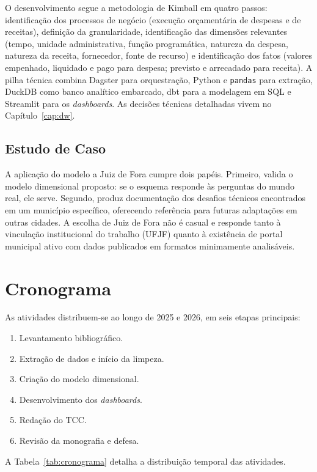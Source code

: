 O desenvolvimento segue a metodologia de Kimball em quatro passos: identificação dos processos de negócio (execução orçamentária de despesas e de receitas), definição da granularidade, identificação das dimensões relevantes (tempo, unidade administrativa, função programática, natureza da despesa, natureza da receita, fornecedor, fonte de recurso) e identificação dos fatos (valores empenhado, liquidado e pago para despesa; previsto e arrecadado para receita). A pilha técnica combina Dagster para orquestração, Python e \texttt{pandas} para extração, DuckDB como banco analítico embarcado, dbt para a modelagem em SQL e Streamlit para os \textit{dashboards}. As decisões técnicas detalhadas vivem no Capítulo~\ref{cap:dw}.

\subsection*{Estudo de Caso}

A aplicação do modelo a Juiz de Fora cumpre dois papéis. Primeiro, valida o modelo dimensional proposto: se o esquema responde às perguntas do mundo real, ele serve. Segundo, produz documentação dos desafios técnicos encontrados em um município específico, oferecendo referência para futuras adaptações em outras cidades. A escolha de Juiz de Fora não é casual e responde tanto à vinculação institucional do trabalho (UFJF) quanto à existência de portal municipal ativo com dados publicados em formatos minimamente analisáveis.

\section{Cronograma}

As atividades distribuem-se ao longo de 2025 e 2026, em seis etapas principais:

\begin{enumerate}
    \item Levantamento bibliográfico.
    \item Extração de dados e início da limpeza.
    \item Criação do modelo dimensional.
    \item Desenvolvimento dos \textit{dashboards}.
    \item Redação do TCC.
    \item Revisão da monografia e defesa.
\end{enumerate}

A Tabela~\ref{tab:cronograma} detalha a distribuição temporal das atividades.

